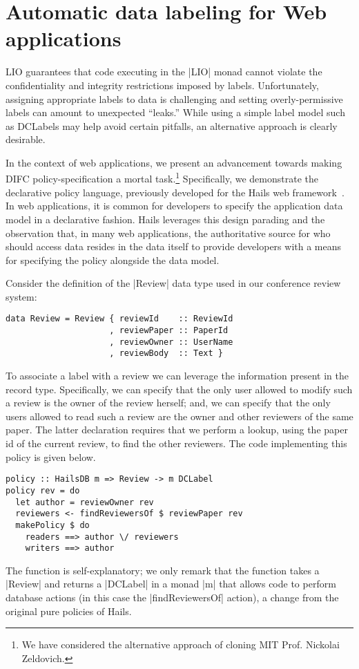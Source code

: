 \section{Automatic data labeling for Web applications}

LIO guarantees that code executing in the \hs|LIO| monad cannot
violate the confidentiality and integrity restrictions imposed by
labels.
%
Unfortunately, assigning appropriate labels to data is challenging and
setting overly-permissive labels can amount to unexpected ``leaks.''
%
While using a simple label model such as DCLabels may help avoid
certain pitfalls, an alternative approach is clearly desirable.

In the context of web applications, we present an advancement towards
making DIFC policy-specification a mortal task.\footnote{
  We have considered the alternative approach of cloning MIT Prof.
  Nickolai Zeldovich.
}
%
Specifically, we demonstrate the declarative policy language, previously
developed for the Hails web framework~\cite{hails}.
%
In web applications, it is common for developers to specify the
application data model in a declarative fashion.
%
Hails leverages this design parading and the observation that, in many
web applications, the authoritative source for who should access data
resides in the data itself to provide developers with a means for
specifying the policy alongside the data model.
%

Consider the definition of the \hs|Review| data type used in our
conference review system:
\begin{verbatim}
data Review = Review { reviewId    :: ReviewId
                     , reviewPaper :: PaperId
                     , reviewOwner :: UserName
                     , reviewBody  :: Text }
\end{verbatim}
To associate a label with a review we can leverage the 
information present in the record type.
%
Specifically, we can specify that the only user allowed to modify such
a review is the owner of the review herself; and, we can specify that
the only users allowed to read such a review are the owner and other
reviewers of the same paper.
%
The latter declaration requires that we perform a lookup, using the
paper id of the current review, to find the other reviewers.
%
The code implementing this policy is given below.
%
\begin{verbatim}
policy :: HailsDB m => Review -> m DCLabel
policy rev = do
  let author = reviewOwner rev
  reviewers <- findReviewersOf $ reviewPaper rev
  makePolicy $ do
    readers ==> author \/ reviewers
    writers ==> author
\end{verbatim}
%
The function is self-explanatory; we only remark that the function
takes a \hs|Review| and returns a \hs|DCLabel| in a monad \hs|m| that
allows code to perform database actions (in this case the
\hs|findReviewersOf| action), a change from the original pure policies
of Hails.
%

